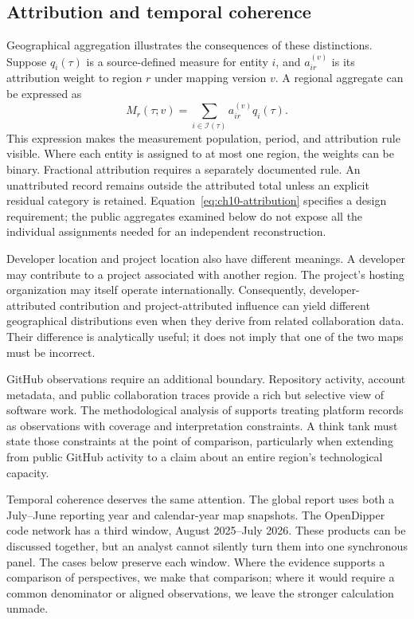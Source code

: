 \subsection{Attribution and temporal coherence}
Geographical aggregation illustrates the consequences of these distinctions. Suppose \(q_i(\tau)\) is a source-defined measure for entity \(i\), and \(a_{ir}^{(v)}\) is its attribution weight to region \(r\) under mapping version \(v\). A regional aggregate can be expressed as
\begin{equation}
M_r(\tau;v)=\sum_{i\in\mathcal I(\tau)} a_{ir}^{(v)}q_i(\tau).
\label{eq:ch10-attribution}
\end{equation}
This expression makes the measurement population, period, and attribution rule visible. Where each entity is assigned to at most one region, the weights can be binary. Fractional attribution requires a separately documented rule. An unattributed record remains outside the attributed total unless an explicit residual category is retained. Equation~\ref{eq:ch10-attribution} specifies a design requirement; the public aggregates examined below do not expose all the individual assignments needed for an independent reconstruction.

Developer location and project location also have different meanings. A developer may contribute to a project associated with another region. The project's hosting organization may itself operate internationally. Consequently, developer-attributed contribution and project-attributed influence can yield different geographical distributions even when they derive from related collaboration data. Their difference is analytically useful; it does not imply that one of the two maps must be incorrect.

GitHub observations require an additional boundary. Repository activity, account metadata, and public collaboration traces provide a rich but selective view of software work. The methodological analysis of \citet{kalliamvakou2014} supports treating platform records as observations with coverage and interpretation constraints. A think tank must state those constraints at the point of comparison, particularly when extending from public GitHub activity to a claim about an entire region's technological capacity.

Temporal coherence deserves the same attention. The global report uses both a July--June reporting year and calendar-year map snapshots. The OpenDipper code network has a third window, August 2025--July 2026. These products can be discussed together, but an analyst cannot silently turn them into one synchronous panel. The cases below preserve each window. Where the evidence supports a comparison of perspectives, we make that comparison; where it would require a common denominator or aligned observations, we leave the stronger calculation unmade.

